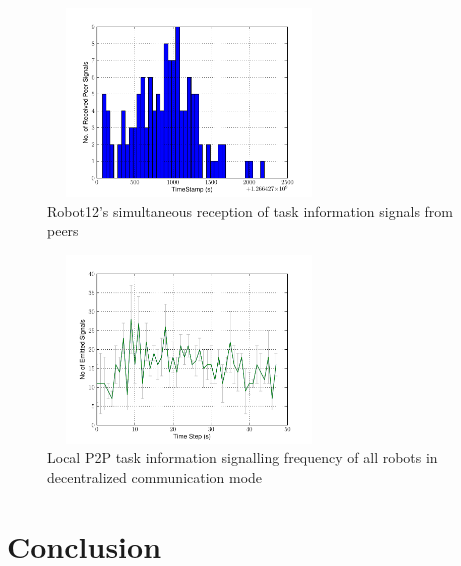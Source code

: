 \documentclass{ifacconf}
\begin{document}
\begin{figure}
\begin{center}
\includegraphics[width=7.5cm,height=5cm]{./images/Robot12-17feb-3-LocalSignals}
\caption{Robot12's simultaneous reception of task information signals from peers} 
\label{fig:robot-freq}
\end{center}
\end{figure}
\begin{figure}
\begin{center}
\includegraphics[width=7.5cm,height=5cm]{./images/Local-500cm-SignalingFreqStat}    %
\caption{Local P2P task information signalling frequency of all robots in decentralized communication mode} 
\label{fig:global-freq}
\end{center}
\end{figure}
\section{Conclusion}
\label{sec:conc}

\end{document}
